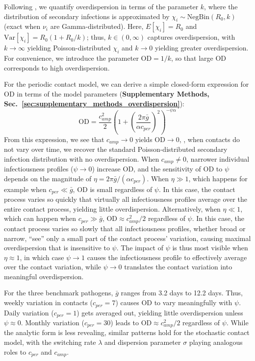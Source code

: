 Following \citet{lloyd-smith_superspreading_2005}, we quantify overdispersion in terms of the parameter $k$, where the distribution of secondary infections is approximated by $\chi_i \sim \text{NegBin}(R_0, k)$ (exact when $\nu_i$ are Gamma-distributed). Here, $E[\chi_i] = R_0$ and $\text{Var}[\chi_i] = R_0 (1 + R_0 / k)$; thus, $k \in (0, \infty)$ captures overdispersion, with $k \rightarrow \infty$ yielding Poisson-distributed $\chi_i$ and $k \rightarrow 0$ yielding greater overdispersion. For convenience, we introduce the parameter $\text{OD} = 1/k$, so that large $\text{OD}$ corresponds to high overdispersion. 

For the periodic contact model, we can derive a simple closed-form expression for $\text{OD}$ in terms of the model parameters ({\bf Supplementary Methods, Sec.~\ref{sec:supplementary_methods_overdispersion}}): 
\begin{equation}
	\text{OD} = \frac{c_{amp}^2}{2} \left( 1 + \left(\frac{2 \pi \bar{g}}{\alpha c_{per}}\right)^2 \right)^{-\psi \alpha}
\end{equation}
From this expression, we see that $c_{amp} \rightarrow 0$ yields $\text{OD} \rightarrow 0$, \ie, when contacts do not vary over time, we recover the standard Poisson-distributed secondary infection distribution with no overdispersion. When $c_{amp} \neq 0$, narrower individual infectiousness profiles ($\psi \rightarrow 0$) increase $\text{OD}$, and the sensitivity of $\text{OD}$ to $\psi$ depends on the magnitude of $\eta = 2 \pi \bar{g} / (\alpha c_{per})$. When $\eta \gg 1$, which happens for example when $c_{per} \ll \bar{g}$, $\text{OD}$ is small regardless of $\psi$. In this case, the contact process varies so quickly that virtually all infectiousness profiles average over the entire contact process, yielding little overdispersion. Alternatively, when $\eta \ll 1$, which can happen when $c_{per} \gg\bar{g}$, $\text{OD} \approx c_{amp}^2 / 2$ regardless of $\psi$. In this case, the contact process varies so slowly that all infectiousness profiles, whether broad or narrow, ``see'' only a small part of the contact process' variation, causing maximal overdispersion that is insensitive to $\psi$. The impact of $\psi$ is thus most visible when $\eta \approx 1$, in which case $\psi \rightarrow 1$ causes the infectiousness profile to effectively average over the contact variation, while $\psi \rightarrow 0$ translates the contact variation into meaningful overdispersion. 

For the three benchmark pathogens, $\bar{g}$ ranges from 3.2 days to 12.2 days. Thus, weekly variation in contacts ($c_{per} = 7$) causes $\text{OD}$ to vary meaningfully with $\psi$. Daily variation ($c_{per} = 1$) gets averaged out, yielding little overdispersion unless $\psi \approx 0$. Monthly variation ($c_{per} = 30$) leads to $\text{OD} \approx c_{amp}^2 / 2$ regardless of $\psi$. While the analytic form is less revealing, similar patterns hold for the stochastic contact model, with the switching rate $\lambda$ and dispersion parameter $\sigma$ playing analogous roles to $c_{per}$ and $c_{amp}$. 

